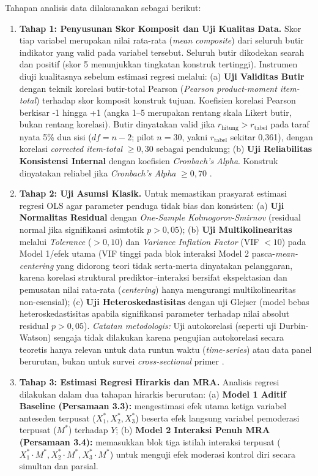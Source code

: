 \documentclass[12pt,a4paper]{article}
\numberwithin{equation}{section}
\numberwithin{table}{section}
\numberwithin{figure}{section}
\begin{document}
Tahapan analisis data dilaksanakan sebagai berikut:
\begin{enumerate}
  \item \textbf{Tahap 1: Penyusunan Skor Komposit dan Uji Kualitas Data.} Skor tiap variabel merupakan nilai rata-rata (\emph{mean composite}) dari seluruh butir indikator yang valid pada variabel tersebut. Seluruh butir dikodekan searah dan positif (skor 5 menunjukkan tingkatan konstruk tertinggi). Instrumen diuji kualitasnya sebelum estimasi regresi melalui: (a) \textbf{Uji Validitas Butir} dengan teknik korelasi butir-total Pearson (\emph{Pearson product-moment item-total}) terhadap skor komposit konstruk tujuan. Koefisien korelasi Pearson berkisar -1 hingga +1 (angka 1--5 merupakan rentang skala Likert butir, bukan rentang korelasi). Butir dinyatakan valid jika $r_{\text{hitung}} > r_{\text{tabel}}$ pada taraf nyata 5\% dua sisi ($df=n-2$; pilot $n=30$, yakni $r_{\text{tabel}}$ sekitar 0,361), dengan korelasi \emph{corrected item-total} $\ge 0{,}30$ sebagai pendukung; (b) \textbf{Uji Reliabilitas Konsistensi Internal} dengan koefisien \emph{Cronbach's Alpha}. Konstruk dinyatakan reliabel jika \emph{Cronbach's Alpha} $\ge 0,70$ \citep{ghozali2018aplikasi, sekaran2016research}.

  \item \textbf{Tahap 2: Uji Asumsi Klasik.} Untuk memastikan prasyarat estimasi regresi OLS agar parameter penduga tidak bias dan konsisten: (a) \textbf{Uji Normalitas Residual} dengan \emph{One-Sample Kolmogorov-Smirnov} (residual normal jika signifikansi asimtotik $p > 0,05$); (b) \textbf{Uji Multikolinearitas} melalui \emph{Tolerance} ($> 0,10$) dan \emph{Variance Inflation Factor} (VIF $< 10$) pada Model 1/efek utama (VIF tinggi pada blok interaksi Model 2 pasca-\emph{mean-centering} yang didorong teori tidak serta-merta dinyatakan pelanggaran, karena korelasi struktural prediktor--interaksi bersifat ekspektasian dan pemusatan nilai rata-rata (\emph{centering}) hanya mengurangi multikolinearitas non-esensial); (c) \textbf{Uji Heteroskedastisitas} dengan uji Glejser (model bebas heteroskedastisitas apabila signifikansi parameter terhadap nilai absolut residual $p > 0,05$).
\emph{Catatan metodologis:} Uji autokorelasi (seperti uji Durbin-Watson) sengaja tidak dilakukan karena pengujian autokorelasi secara teoretis hanya relevan untuk data runtun waktu (\emph{time-series}) atau data panel berurutan, bukan untuk survei \emph{cross-sectional} primer \citep{ghozali2018aplikasi}.

  \item \textbf{Tahap 3: Estimasi Regresi Hirarkis dan MRA.} Analisis regresi dilakukan dalam dua tahapan hirarkis berurutan: (a) \textbf{Model 1 Aditif Baseline (Persamaan 3.3):} mengestimasi efek utama ketiga variabel anteseden terpusat ($X_1^*, X_2^*, X_3^*$) beserta efek langsung variabel pemoderasi terpusat ($M^*$) terhadap $Y$; (b) \textbf{Model 2 Interaksi Penuh MRA (Persamaan 3.4):} memasukkan blok tiga istilah interaksi terpusat ($X_1^* \cdot M^*, X_2^* \cdot M^*, X_3^* \cdot M^*$) untuk menguji efek moderasi kontrol diri secara simultan dan parsial.


\end{enumerate}
\end{document}
